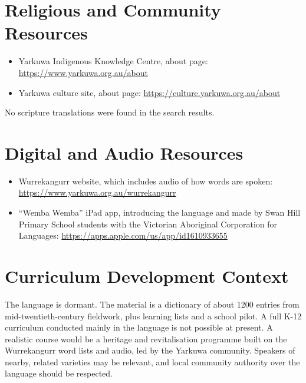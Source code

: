 \documentclass[12pt]{article}
\begin{document}
\section{Religious and Community Resources}
\begin{itemize}
\item Yarkuwa Indigenous Knowledge Centre, about page: \url{https://www.yarkuwa.org.au/about}
\item Yarkuwa culture site, about page: \url{https://culture.yarkuwa.org.au/about}
\end{itemize}
No scripture translations were found in the search results.

\section{Digital and Audio Resources}
\begin{itemize}
\item Wurrekangurr website, which includes audio of how words are spoken: \url{https://www.yarkuwa.org.au/wurrekangurr}
\item ``Wemba Wemba'' iPad app, introducing the language and made by Swan Hill Primary School students with the Victorian Aboriginal Corporation for Languages: \url{https://apps.apple.com/us/app/id1610933655}
\end{itemize}

\section{Curriculum Development Context}
The language is dormant. The material is a dictionary of about 1200 entries from mid-twentieth-century fieldwork, plus learning lists and a school pilot. A full K-12 curriculum conducted mainly in the language is not possible at present. A realistic course would be a heritage and revitalisation programme built on the Wurrekangurr word lists and audio, led by the Yarkuwa community. Speakers of nearby, related varieties may be relevant, and local community authority over the language should be respected.
\end{document}
